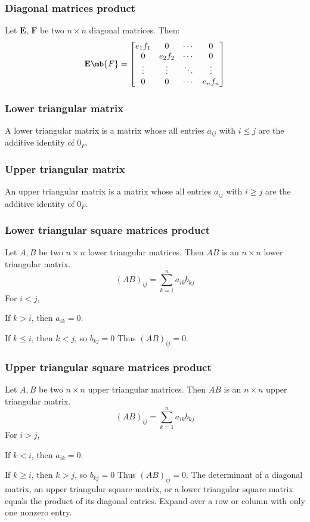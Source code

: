 \documentclass[a4paper,12pt]{report}
\begin{document}
\subsubsection{Diagonal matrices product}
Let $\mathbf{E}$, $\mathbf{F}$ be two $n\times n$ diagonal matrices. Then:
\[\mathbf{E}\mb{F} = \begin{bmatrix}
e_1f_1 & 0 & \cdots & 0 \\
0 & e_2f_2 & \cdots & 0 \\
\vdots & \vdots & \ddots & \vdots \\
0 & 0 & \cdots & e_nf_n
\end{bmatrix}\]
\subsubsection{Lower triangular matrix}
A lower triangular matrix is a matrix whose all entries $a_{ij}$ with $i\le j$ are the additive identity of $0_{F}$.
\subsubsection{Upper triangular matrix}
An upper triangular matrix is a matrix whose all entries $a_{ij}$ with $i\ge j$ are the additive identity of $0_{F}$.
\subsubsection{Lower triangular square matrices product}
Let $A,B$ be two $n\times n$ lower triangular matrices. Then $AB$ is an $n\times n$ lower triangular matrix.
\bpr
\[(AB)_{ij}=\sum_{k=1}^na_{ik}b_{kj}\]
For $i<j$,
\bit
\item If $k>i$, then $a_{ik}=0$.
\item If $k\le i$, then $k<j$, so $b_{kj}=0$
\eit
Thus $(AB)_{ij}=0$.
\epr
\subsubsection{Upper triangular square matrices product}
Let $A,B$ be two $n\times n$ upper triangular matrices. Then $AB$ is an $n\times n$ upper triangular matrix.
\bpr
\[(AB)_{ij}=\sum_{k=1}^na_{ik}b_{kj}\]
For $i>j$,
\bit
\item If $k<i$, then $a_{ik}=0$.
\item If $k\ge i$, then $k>j$, so $b_{kj}=0$
\eit
Thus $(AB)_{ij}=0$.
\epr
{}
The determinant of a diagonal matrix, an upper triangular square matrix, or a lower triangular square matrix equals the product of its diagonal entries.
\bpr
Expand over a row or column with only one nonzero entry.
\epr
\end{document}
